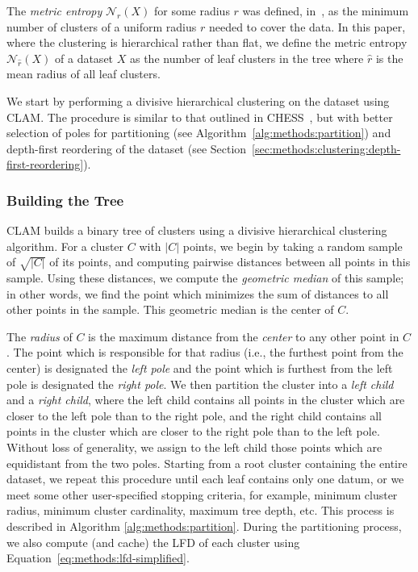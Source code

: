 The \textit{metric entropy} $\mathcal{N}_{r}(X)$ for some radius $r$ was defined, in~\cite{yu2015entropy}, as the minimum number of clusters of a uniform radius $r$ needed to cover the data.
In this paper, where the clustering is hierarchical rather than flat, we define the metric entropy $\mathcal{N}_{\hat{r}}(X)$ of a dataset $X$ as the number of leaf clusters in the tree where $\hat{r}$ is the mean radius of all leaf clusters.

We start by performing a divisive hierarchical clustering on the dataset using CLAM.
The procedure is similar to that outlined in CHESS~\cite{ishaq2019clustered}, but with
better selection of poles for partitioning (see Algorithm~\ref{alg:methods:partition}) and depth-first reordering of the dataset (see Section~\ref{sec:methods:clustering:depth-first-reordering}).


\subsubsection{Building the Tree}
\label{sec:methods:clustering:building-the-tree}

CLAM builds a binary tree of clusters using a divisive hierarchical clustering algorithm.
For a cluster $C$ with $|C|$ points, we begin by taking a random sample of $\sqrt{|C|}$ of its points, and computing pairwise distances between all points in this sample.
Using these distances, we compute the \textit{geometric median} of this sample; in other words, we find the point which minimizes the sum of distances to all other points in the sample.
This geometric median is the center of $C$.

The \textit{radius} of $C$ is the maximum distance from the \textit{center} to any other point in $C$.
The point which is responsible for that radius (i.e., the furthest point from the center) is designated the \textit{left pole} and the point which is furthest from the left pole is designated the \textit{right pole}.
We then partition the cluster into a \textit{left child} and a \textit{right child}, where the left child contains all points in the cluster which are closer to the left pole than to the right pole, and the right child contains all points in the cluster which are closer to the right pole than to the left pole.
Without loss of generality, we assign to the left child those points which are equidistant from the two poles.
Starting from a root cluster containing the entire dataset, we repeat this procedure until each leaf contains only one datum, or we meet some other user-specified stopping criteria, for example, minimum cluster radius, minimum cluster cardinality, maximum tree depth, etc.
This process is described in Algorithm \ref{alg:methods:partition}.
During the partitioning process, we also compute (and cache) the LFD of each cluster using Equation~\ref{eq:methods:lfd-simplified}.

